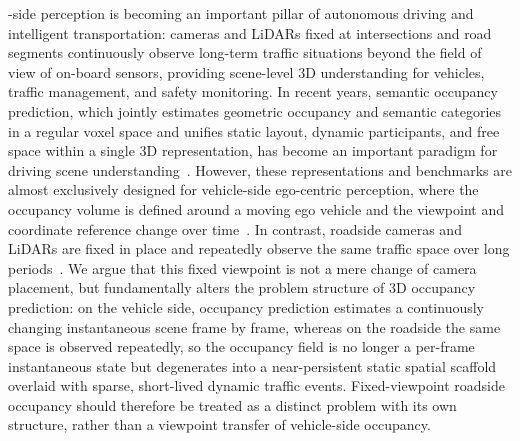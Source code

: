 

-side perception is becoming an important pillar
of autonomous driving and intelligent transportation: cameras and LiDARs fixed
at intersections and road segments continuously observe long-term traffic
situations beyond the field of view of on-board sensors, providing scene-level
3D understanding for vehicles, traffic management, and safety monitoring. In
recent years, semantic occupancy prediction, which jointly estimates geometric
occupancy and semantic categories in a regular voxel space and unifies static
layout, dynamic participants, and free space within a single 3D
representation, has become an important paradigm for driving scene
understanding~\cite{OpenOccupancy,Occ3D,TPVFormer,SurroundOcc}. However, these
representations and benchmarks are almost exclusively designed for vehicle-side
ego-centric perception, where the occupancy volume is defined around a moving
ego vehicle and the viewpoint and coordinate reference change over
time~\cite{nuScenes,Occ3D,OpenOccupancy,SurroundOcc}. In contrast, roadside
cameras and LiDARs are fixed in place and repeatedly observe the same traffic
space over long periods~\cite{Rope3D,DAIRV2X,V2XReal,RCooper,TUMTrafV2X}. We
argue that this fixed viewpoint is not a mere change of camera placement, but
fundamentally alters the problem structure of 3D occupancy prediction: on the
vehicle side, occupancy prediction estimates a continuously changing
instantaneous scene frame by frame, whereas on the roadside the same space is
observed repeatedly, so the occupancy field is no longer a per-frame
instantaneous state but degenerates into a near-persistent static spatial
scaffold overlaid with sparse, short-lived dynamic traffic events.
Fixed-viewpoint roadside occupancy should therefore be treated as a distinct
problem with its own structure, rather than a viewpoint transfer of
vehicle-side occupancy.


